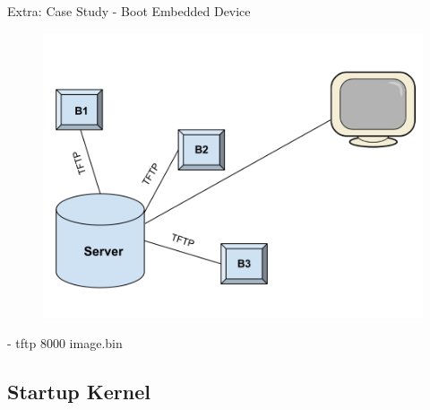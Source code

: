 \documentclass{workshop}
\begin{document}
\begin{frame}{Extra: Case Study - Boot Embedded Device}
\begin{figure}
         \includegraphics[scale=0.17]{img/complex.png}
      \end{figure}
      \begin{center}
      \tiny{- tftp 8000 image.bin}
      \end{center}
\end{frame}


\subsection{Startup Kernel}
\end{document}
